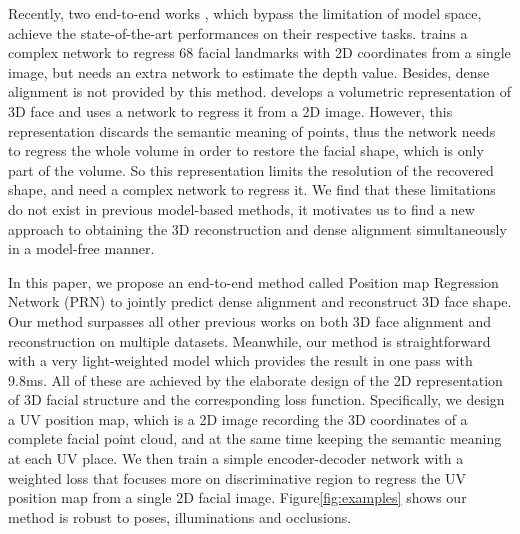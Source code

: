 \documentclass[runningheads]{llncs}
\begin{document}
Recently, two end-to-end works \cite{Jackson2017Large} \cite{Bulat2017How}, which bypass the limitation of model space, achieve the state-of-the-art performances on their respective tasks.
\cite{Bulat2017How} trains a complex network to regress 68 facial landmarks with 2D coordinates from a single image, but needs an extra network to estimate the depth value. Besides, dense alignment is not provided by this method.
\cite{Jackson2017Large} develops a volumetric representation of 3D face and uses a network to regress it from a 2D image. However, this representation discards the semantic meaning of points, 
thus the network needs to regress the whole volume in order to restore the facial shape, which is only part of the volume. So this representation limits the resolution of the recovered shape, and need a complex network to regress it.
We find that these limitations do not exist in previous model-based methods, it motivates us to find a new approach to obtaining the 3D reconstruction and dense alignment simultaneously in a model-free manner.




In this paper, we propose an end-to-end method called Position map Regression Network (PRN) to jointly predict dense alignment and reconstruct 3D face shape. 
Our method surpasses all other previous works on both 3D face alignment and reconstruction on multiple datasets.
Meanwhile, our method is straightforward with a very light-weighted model which provides the result in one pass with 9.8ms.
All of these are achieved by the elaborate design of the 2D representation of 3D facial structure and the corresponding loss function. 
Specifically, we design a UV position map, which is a 2D image recording the 3D coordinates of a complete facial point cloud, and at the same time keeping the semantic meaning at each UV place. 
We then train a simple encoder-decoder network with a weighted loss that focuses more on discriminative region to regress the UV position map from a single 2D facial image. Figure\ref{fig:examples} shows our method is robust to poses, illuminations and occlusions.
\end{document}
